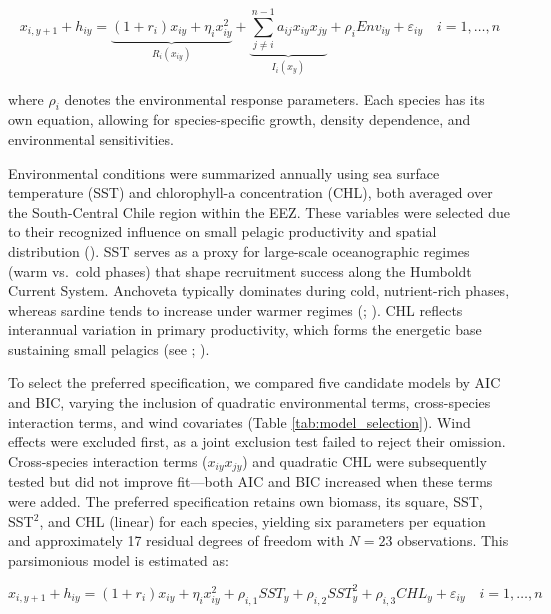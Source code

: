 \documentclass[
  11pt,
]{article}
\begin{document}
\begin{equation}
x_{i,y+1} + h_{iy} = \underbrace{(1 + r_i)x_{iy} + \eta_i x_{iy}^2}_{R_i(x_{iy})} + \underbrace{\sum_{j \neq i}^{n-1} a_{ij} x_{iy} x_{jy}}_{I_i(x_y)} + \rho_i Env_{iy} + \varepsilon_{iy} \quad i=1,\ldots,n
\label{eq2}
\end{equation}

where \(\rho_i\) denotes the environmental response parameters. Each species has its own equation, allowing for species-specific growth, density dependence, and environmental sensitivities.

Environmental conditions were summarized annually using sea surface temperature (SST) and chlorophyll-a concentration (CHL), both averaged over the South-Central Chile region within the EEZ. These variables were selected due to their recognized influence on small pelagic productivity and spatial distribution (). SST serves as a proxy for large-scale oceanographic regimes (warm vs.~cold phases) that shape recruitment success along the Humboldt Current System. Anchoveta typically dominates during cold, nutrient-rich phases, whereas sardine tends to increase under warmer regimes (; ). CHL reflects interannual variation in primary productivity, which forms the energetic base sustaining small pelagics (see ; ).

To select the preferred specification, we compared five candidate models by AIC and BIC, varying the inclusion of quadratic environmental terms, cross-species interaction terms, and wind covariates (Table \ref{tab:model_selection}). Wind effects were excluded first, as a joint exclusion test failed to reject their omission. Cross-species interaction terms (\(x_{iy} x_{jy}\)) and quadratic CHL were subsequently tested but did not improve fit---both AIC and BIC increased when these terms were added. The preferred specification retains own biomass, its square, SST, SST\(^2\), and CHL (linear) for each species, yielding six parameters per equation and approximately 17 residual degrees of freedom with \(N = 23\) observations. This parsimonious model is estimated as:

\begin{equation}
x_{i,y+1} + h_{iy} = (1 + r_i)x_{iy} + \eta_i x_{iy}^2 + \rho_{i,1} SST_y + \rho_{i,2} SST_y^2 + \rho_{i,3} CHL_y + \varepsilon_{iy} \quad i=1,\ldots,n
\label{eq2b}
\end{equation}
\end{document}
